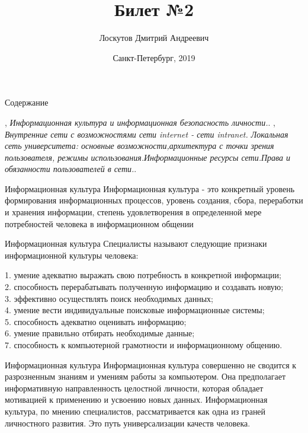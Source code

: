 \documentclass{beamer}
\begin{document}
\title{Билет №2}  
\author{Лоскутов Дмитрий Андреевич}
\date{Санкт-Петербург, 2019} 
\frame{\titlepage} 
\begin{frame}{Содержание}
 \begin{thebibliography}{10}
\beamertemplatebookbibitems
{}
{}, {\em Информационная культура и информационная безопасность личности.}.
{}, {\em Внутренние сети с возможностями сети internet - сети intranet. Локальная сеть университета: основные возможности,архитектура с точки зрения пользователя, режимы использования.Информационные ресурсы сети.Права и обязанности пользователей в сети.}.
\end{thebibliography}
\end{frame}

\begin{frame}{Информационная культура}
   Информационная культура - это конкретный уровень формирования информационных процессов, уровень создания, сбора, переработки и хранения информации, степень удовлетворения в определенной мере потребностей человека в информационном общении
\end{frame}

\begin{frame}{Информационная культура}
 Специалисты называют следующие признаки информационной культуры человека:
 
1. умение адекватно выражать свою потребность в конкретной информации;\\
2. способность перерабатывать полученную информацию и создавать новую;\\
3. эффективно осуществлять поиск необходимых данных;\\
4. умение вести индивидуальные поисковые информационные системы;\\
5. способность адекватно оценивать информацию;\\
6. умение правильно отбирать необходимые данные;\\
7. способность к компьютерной грамотности и информационному общению.

\end{frame}

\begin{frame}{Информационная культура}
    Информационная культура совершенно не  сводится к разрозненным знаниям и умениям работы за компьютером. Она предполагает информативную направленность целостной личности, которая обладает мотивацией к применению и усвоению новых данных. Информационная культура, по мнению специалистов, рассматривается как одна из граней личностного развития. Это путь универсализации качеств человека. 
\end{frame}
\end{document}
